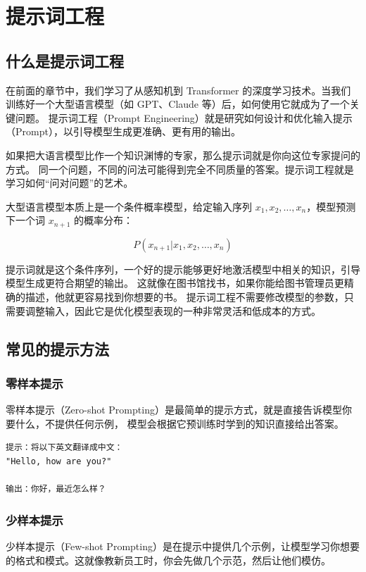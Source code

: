 \chapter{提示词工程}
\section{什么是提示词工程}
在前面的章节中，我们学习了从感知机到 Transformer 的深度学习技术。当我们训练好一个大型语言模型（如 GPT、Claude 等）后，如何使用它就成为了一个关键问题。
提示词工程（Prompt Engineering）就是研究如何设计和优化输入提示（Prompt），以引导模型生成更准确、更有用的输出。

如果把大语言模型比作一个知识渊博的专家，那么提示词就是你向这位专家提问的方式。
同一个问题，不同的问法可能得到完全不同质量的答案。提示词工程就是学习如何“问对问题”的艺术。

大型语言模型本质上是一个条件概率模型，给定输入序列 $x_1, x_2, \ldots, x_n$，模型预测下一个词 $x_{n+1}$ 的概率分布：

\begin{equation*}
	P(x_{n+1} | x_1, x_2, \ldots, x_n)
\end{equation*}

提示词就是这个条件序列，一个好的提示能够更好地激活模型中相关的知识，引导模型生成更符合期望的输出。
这就像在图书馆找书，如果你能给图书管理员更精确的描述，他就更容易找到你想要的书。
提示词工程不需要修改模型的参数，只需要调整输入，因此它是优化模型表现的一种非常灵活和低成本的方式。

\section{常见的提示方法}

\subsection{零样本提示}
零样本提示（Zero-shot Prompting）是最简单的提示方式，就是直接告诉模型你要什么，不提供任何示例，
模型会根据它预训练时学到的知识直接给出答案。

\begin{verbatim}
提示：将以下英文翻译成中文：
"Hello, how are you?"

输出：你好，最近怎么样？
\end{verbatim}

\subsection{少样本提示}
少样本提示（Few-shot Prompting）是在提示中提供几个示例，让模型学习你想要的格式和模式。这就像教新员工时，你会先做几个示范，然后让他们模仿。

